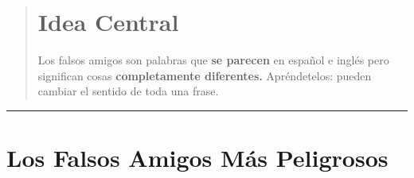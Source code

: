 \documentclass[
  spanish,
  letterpaper,
]{scrbook}
\begin{document}
\begin{quote}
\section{Idea Central}\label{idea-central-19}

Los falsos amigos son palabras que \textbf{se parecen} en español e
inglés pero significan cosas \textbf{completamente diferentes.}
Apréndetelos: pueden cambiar el sentido de toda una frase.
\end{quote}

\begin{center}\rule{0.5\linewidth}{0.5pt}\end{center}

\section{Los Falsos Amigos Más
Peligrosos}\label{los-falsos-amigos-muxe1s-peligrosos}
\end{document}
